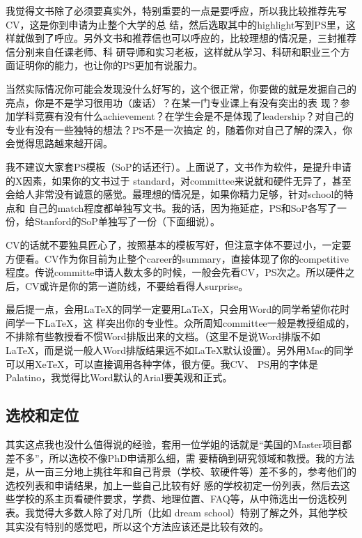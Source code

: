我觉得文书除了必须要真实外，特别重要的一点是要呼应，所以我比较推荐先写CV，这是你到申请为止整个大学的总 结，然后选取其中的highlight写到PS里，这样就做到了呼应。另外文书和推荐信也可以呼应的，比较理想的情况是，三封推荐信分别来自任课老师、科 研导师和实习老板，这样就从学习、科研和职业三个方面证明你的能力，也让你的PS更加有说服力。\par

当然实际情况你可能会发现没什么好写的，这个很正常，你要做的就是发掘自己的亮点，你是不是学习很用功（废话）？在某一门专业课上有没有突出的表 现？参加学科竞赛有没有什么achievement？在学生会是不是体现了leadership？对自己的专业有没有一些独特的想法？PS不是一次搞定 的，随着你对自己了解的深入，你会觉得思路越来越开阔。\par

我不建议大家套PS模板（SoP的话还行）。上面说了，文书作为软件，是提升申请的X因素，如果你的文书过于 standard，对committee来说就和硬件无异了，甚至会给人非常没有诚意的感觉。最理想的情况是，如果你精力足够，针对school的特点和 自己的match程度都单独写文书。我的话，因为拖延症，PS和SoP各写了一份，给Stanford的SoP单独写了一份（下面细说）。\par

CV的话就不要独具匠心了，按照基本的模板写好，但注意字体不要过小，一定要方便看。CV作为你目前为止整个career的summary，直接体现了你的competitive程度。传说committe申请人数太多的时候，一般会先看CV，PS次之。所以硬件之后，CV或许是你的第一道防线，不要给看得人surprise。\par

最后提一点，会用LaTeX的同学一定要用LaTeX，只会用Word的同学希望你花时间学一下LaTeX，这 样突出你的专业性。众所周知committee一般是教授组成的，不排除有些教授看不惯Word排版出来的文档。（这里不是说Word排版不如 LaTeX，而是说一般人Word排版结果远不如LaTeX默认设置）。另外用Mac的同学可以用XeTeX，可以直接调用各种字体，很方便。我CV、 PS用的字体是Palatino，我觉得比Word默认的Arial要美观和正式。\par

\subsection{选校和定位}

其实这点我也没什么值得说的经验，套用一位学姐的话就是“美国的Master项目都差不多”，所以选校不像PhD申请那么细，需 要精确到研究领域和教授。我的方法是，从一亩三分地上挑往年和自己背景（学校、软硬件等）差不多的，参考他们的选校列表和申请结果，加上一些自己比较有好 感的学校初定一份列表，然后去这些学校的系主页看硬件要求，学费、地理位置、FAQ等，从中筛选出一份选校列表。我觉得大多数人除了对几所（比如 dream school）特别了解之外，其他学校其实没有特别的感觉吧，所以这个方法应该还是比较有效的。\par

